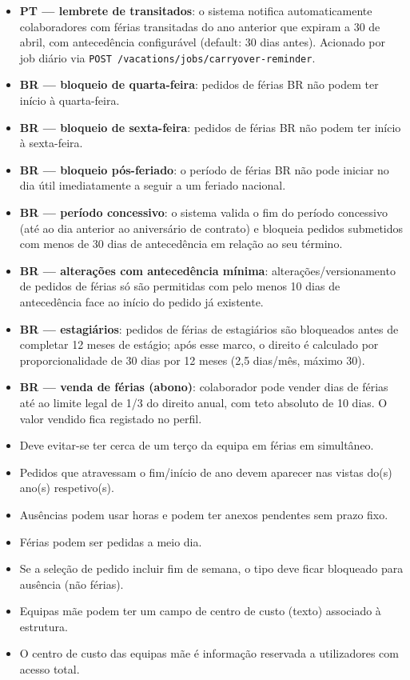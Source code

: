 \documentclass[11pt,a4paper]{article}
\begin{document}
\begin{itemize}
  \item \textbf{PT — lembrete de transitados}: o sistema notifica automaticamente colaboradores com férias transitadas do ano anterior que expiram a 30 de abril, com antecedência configurável (default: 30 dias antes). Acionado por job diário via \texttt{POST /vacations/jobs/carryover-reminder}.
  \item \textbf{BR — bloqueio de quarta-feira}: pedidos de férias BR não podem ter início à quarta-feira.
  \item \textbf{BR — bloqueio de sexta-feira}: pedidos de férias BR não podem ter início à sexta-feira.
  \item \textbf{BR — bloqueio pós-feriado}: o período de férias BR não pode iniciar no dia útil imediatamente a seguir a um feriado nacional.
  \item \textbf{BR — período concessivo}: o sistema valida o fim do período concessivo (até ao dia anterior ao aniversário de contrato) e bloqueia pedidos submetidos com menos de 30 dias de antecedência em relação ao seu término.
  \item \textbf{BR — alterações com antecedência mínima}: alterações/versionamento de pedidos de férias só são permitidas com pelo menos 10 dias de antecedência face ao início do pedido já existente.
  \item \textbf{BR — estagiários}: pedidos de férias de estagiários são bloqueados antes de completar 12 meses de estágio; após esse marco, o direito é calculado por proporcionalidade de 30 dias por 12 meses (2,5 dias/mês, máximo 30).
  \item \textbf{BR — venda de férias (abono)}: colaborador pode vender dias de férias até ao limite legal de 1/3 do direito anual, com teto absoluto de 10 dias. O valor vendido fica registado no perfil.
  \item Deve evitar-se ter cerca de um terço da equipa em férias em simultâneo.
  \item Pedidos que atravessam o fim/início de ano devem aparecer nas vistas do(s) ano(s) respetivo(s).
  \item Ausências podem usar horas e podem ter anexos pendentes sem prazo fixo.
  \item Férias podem ser pedidas a meio dia.
  \item Se a seleção de pedido incluir fim de semana, o tipo deve ficar bloqueado para ausência (não férias).
  \item Equipas mãe podem ter um campo de centro de custo (texto) associado à estrutura.
  \item O centro de custo das equipas mãe é informação reservada a utilizadores com acesso total.

\end{itemize}
\end{document}

